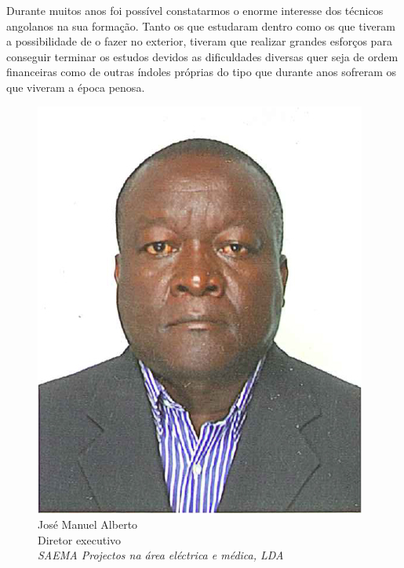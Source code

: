 
\cappar Durante muitos anos foi possível constatarmos o enorme
interesse dos técnicos angolanos na sua formação. Tanto os que
estudaram dentro como os que tiveram a possibilidade de o fazer no
exterior, tiveram que realizar grandes esforços para conseguir
terminar os estudos devidos as dificuldades diversas quer seja de
ordem financeiras como de outras índoles próprias do tipo que durante
anos sofreram os que viveram a época penosa.

\begin{figure} 
  \vspace{-25.5pt}
  \begin{figurebox}
    \vspace{20pt}
    \centering
    \includegraphics[height=0.28\textheight]{JoseManuelAlberto.jpg}\\
    José Manuel Alberto\\ 
    Diretor executivo\\
    {\sl SAEMA Projectos na área
      eléctrica e médica, LDA}
  \end{figurebox}
  \vspace{-10pt}
\end{figure}


